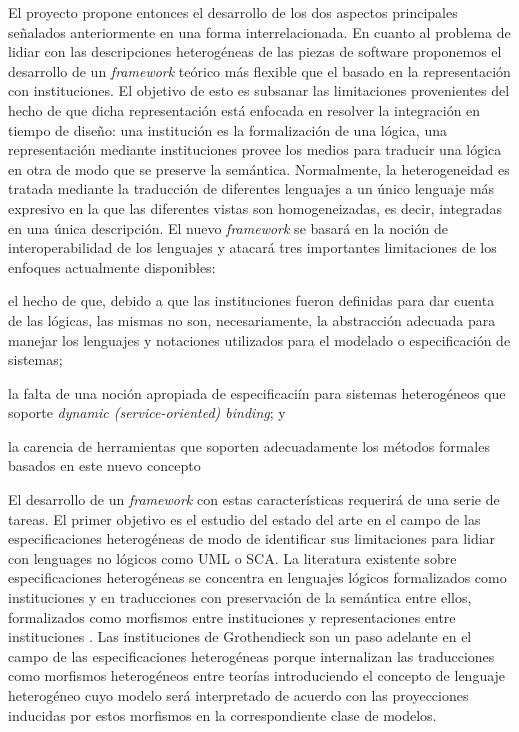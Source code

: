 \documentclass[a4paper, 11pt]{article}
\begin{document}
  El proyecto propone entonces el desarrollo de los dos aspectos principales señalados anteriormente en una forma interrelacionada. En cuanto al problema de lidiar con las descripciones heterogéneas de las piezas de software proponemos el desarrollo de un \emph{framework} teórico más flexible que el basado en la representación con instituciones. El objetivo de esto es subsanar las limitaciones provenientes del hecho de que dicha representación está enfocada en resolver la integración en tiempo de diseño: una institución es la formalización de una lógica, una representación mediante instituciones provee los medios para traducir una lógica en otra de modo que se preserve la semántica. Normalmente, la heterogeneidad es tratada mediante la traducción de diferentes lenguajes a un único lenguaje más expresivo en la que las diferentes vistas son homogeneizadas, es decir, integradas en una única descripción. El nuevo \emph{framework} se basará en la noción de interoperabilidad de los lenguajes y atacará tres importantes limitaciones de los enfoques actualmente disponibles:
  \begin{inparaenum}
  \item el hecho de que, debido a que las instituciones fueron definidas para dar cuenta de las lógicas, las mismas no son, necesariamente, la abstracción adecuada para manejar los lenguajes y notaciones utilizados para el modelado o especificación de sistemas;
  \item la falta de una noción apropiada de especificaciín para sistemas heterogéneos que soporte \emph{dynamic (service-oriented) binding}; y
  \item la carencia de herramientas que soporten adecuadamente los métodos formales basados en este nuevo concepto
  \end{inparaenum}
  
  El desarrollo de un \emph{framework} con estas características requerirá de una serie de tareas. El primer objetivo es el estudio del estado del arte en el campo de las especificaciones heterogéneas de modo de identificar sus limitaciones para lidiar con lenguages no lógicos como UML o SCA. La literatura existente sobre especificaciones heterogéneas se concentra en lenguajes lógicos formalizados como instituciones \cite{goguen:cmwlp84} y en traducciones con preservación de la semántica entre ellos, formalizados como morfismos entre instituciones \cite{goguen:jacm-39_1} y representaciones entre instituciones \cite{tarlecki:sadt-rtdts95}. Las instituciones de Grothendieck \cite{diaconescu:acs-10_4} son un paso adelante en el campo de las especificaciones heterogéneas porque internalizan las traducciones como morfismos heterogéneos entre teorías introduciendo el concepto de lenguaje heterogéneo cuyo modelo será interpretado de acuerdo con las proyecciones inducidas por estos morfismos en la correspondiente clase de modelos.
  
\end{document}
